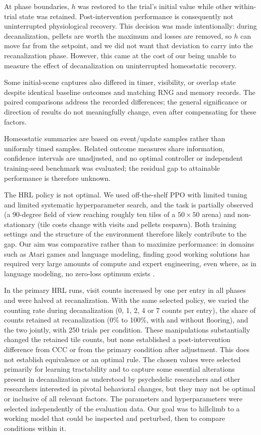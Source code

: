 \documentclass[12pt,fleqn]{article}
\begin{document}
At phase boundaries, $h$ was restored to the trial's initial value while other within-trial state was retained. Post-intervention performance is consequently not uninterrupted physiological recovery. This decision was made intentionally: during decanalization, pellets are worth the maximum and losses are removed, so $h$ can move far from the setpoint, and we did not want that deviation to carry into the recanalization phase. However, this came at the cost of our being unable to measure the effect of decanalization on uninterrupted homeostatic recovery. 

Some initial-scene captures also differed in timer, visibility, or overlap state despite identical baseline outcomes and matching RNG and memory records. The paired comparisons address the recorded differences; the general significance or direction of results do not meaningfully change, even after compensating for these factors.

Homeostatic summaries are based on event/update samples rather than uniformly timed samples. Related outcome measures share information, confidence intervals are unadjusted, and no optimal controller or independent training-seed benchmark was evaluated; the residual gap to attainable performance is therefore unknown.

The HRL policy is not optimal. We used off-the-shelf PPO with limited tuning and limited systematic hyperparameter search, and the task is partially observed (a 90-degree field of view reaching roughly ten tiles of a $50\times50$ arena) and non-stationary (tile costs change with visits and pellets respawn). Both training settings and the structure of the environment therefore likely contribute to the gap. Our aim was comparative rather than to maximize performance: in domains such as Atari games and language modeling, finding good working solutions has required very large amounts of compute and expert engineering, even where, as in language modeling, no zero-loss optimum exists \cite{mnih_human-level_2015, badia_agent57_2020, hoffmann_training_2022}.

In the primary HRL runs, visit counts increased by one per entry in all phases and were halved at recanalization. With the same selected policy, we varied the counting rate during decanalization (0, 1, 2, 4 or 7 counts per entry), the share of counts retained at recanalization (0\% to 100\%, with and without flooring), and the two jointly, with 250 trials per condition. These manipulations substantially changed the retained tile counts, but none established a post-intervention difference from CCC or from the primary condition after adjustment. This does not establish equivalence or an optimal rule. The chosen values were selected primarily for learning tractability and to capture some essential alterations present in decanalization as understood by psychedelic researchers and other researchers interested in pivotal behavioral changes, but they may not be optimal or inclusive of all relevant factors. The parameters and hyperparameters were selected independently of the evaluation data. Our goal was to hillclimb to a working model that could be inspected and perturbed, then to compare conditions within it.
\end{document}
